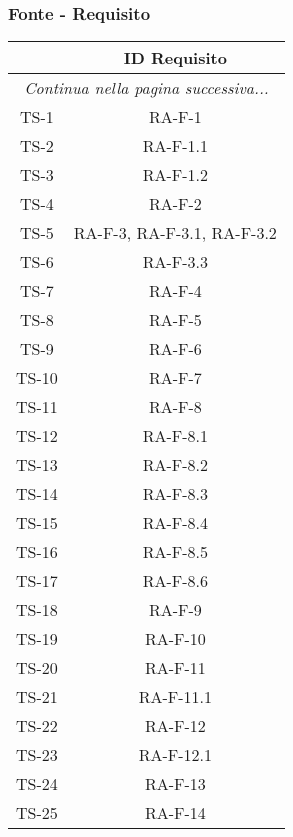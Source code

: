 	\subsubsection{Fonte - Requisito}
		\begin{center}
			\begin{longtable}{|c|c|}
			\hline
			\rowcolor{lighter-grayer}{ \textbf{Fonti} } & {\textbf{ID Requisito} } \\ \hline
			\endhead
			\multicolumn{2}{|c|}{\textit{Continua nella pagina successiva...}}\\
			\hline
			\hline
			\endfoot
			\endlastfoot

			\hline
			TS-1 & RA-F-1 \\
			\hline
			TS-2 & RA-F-1.1 \\
			\hline
			TS-3 & RA-F-1.2 \\
			\hline
			TS-4 & RA-F-2 \\
			\hline
			TS-5 & RA-F-3, RA-F-3.1, RA-F-3.2 \\
			\hline
			TS-6 & RA-F-3.3 \\
			\hline
			TS-7 & RA-F-4 \\
			\hline
			TS-8 & RA-F-5 \\
			\hline
			TS-9 & RA-F-6 \\
			\hline
			TS-10 & RA-F-7 \\
			\hline
			TS-11 & RA-F-8 \\
			\hline
			TS-12 & RA-F-8.1 \\
			\hline
			TS-13 & RA-F-8.2 \\
			\hline
			TS-14 & RA-F-8.3 \\
			\hline
			TS-15 & RA-F-8.4 \\
			\hline
			TS-16 & RA-F-8.5 \\
			\hline
			TS-17 & RA-F-8.6 \\
			\hline
			TS-18 & RA-F-9 \\
			\hline
			TS-19 & RA-F-10 \\
			\hline
			TS-20 & RA-F-11 \\
			\hline
			TS-21 & RA-F-11.1 \\
			\hline
			TS-22 & RA-F-12 \\
			\hline
			TS-23 & RA-F-12.1 \\
			\hline
			TS-24 & RA-F-13 \\
			\hline
			TS-25 & RA-F-14 \\

\end{longtable}
\end{center}
